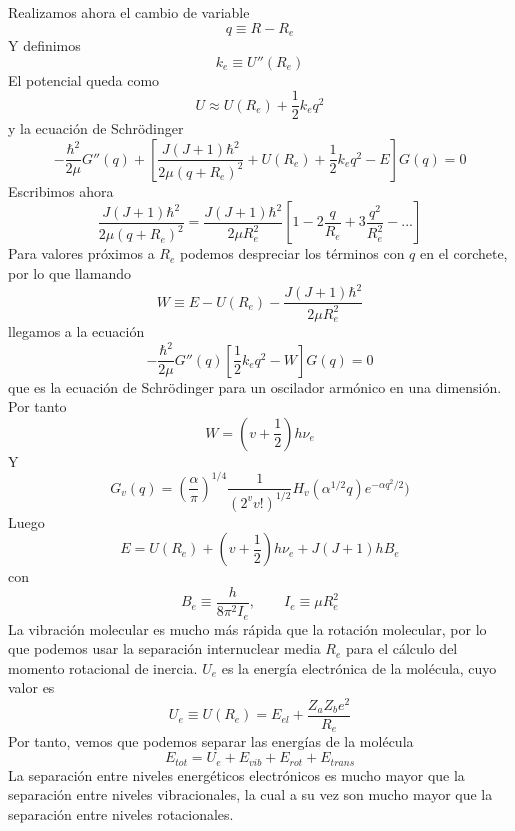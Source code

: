 \documentclass[a4paper]{article}
\begin{document}
Realizamos ahora el cambio de variable 
\begin{equation}
q \equiv R-R_e
\end{equation}
Y definimos 
\begin{equation}
k_e \equiv	U''(R_e)
\end{equation}
El potencial queda como
\begin{equation}
U \approx U(R_e)+\frac{1}{2}k_eq^2
\end{equation}
y la ecuación de Schrödinger
\begin{equation}
-\frac{\hbar^2}{2\mu}G''(q)+\left[\frac{J(J+1)\hbar^2}{2\mu (q+R_e)^2}+U(R_e)+\frac{1}{2}k_eq^2-E\right]G(q)=0
\end{equation}
Escribimos ahora
\begin{equation}\label{aproximacion2}
\frac{J(J+1)\hbar^2}{2\mu (q+R_e)^2}=\frac{J(J+1)\hbar^2}{2\mu R_e^2}\left[1-2\frac{q}{R_e}+3\frac{q^2}{R_e^2}-...\right]
\end{equation}
Para valores próximos a $R_e$ podemos despreciar los términos con $q$ en el corchete, por lo que llamando
\begin{equation}
W \equiv	E-U(R_e)-\frac{J(J+1)\hbar^2}{2\mu R_e^2}
\end{equation}
llegamos a la ecuación
\begin{equation}
-\frac{\hbar^2}{2\mu}G''(q)\left[\frac{1}{2}k_eq^2-W\right] G(q)=0
\end{equation}
que es la ecuación de Schrödinger para un oscilador armónico en una dimensión. Por tanto
\begin{equation}
W=\left(v+\frac{1}{2}\right)h\nu_e
\end{equation}
Y 
\begin{equation}
G_v(q)=\left(\frac{\alpha}{\pi}\right)^{1/4}\frac{1}{(2^vv!)^{1/2}}H_v(\alpha ^{1/2}q)e^{-\alpha q^2/2})
\end{equation}
Luego
\begin{equation}
E=U(R_e)+\left(v+\frac{1}{2}\right)h\nu_e+J(J+1)hB_e
\end{equation}
con
\begin{equation}
B_e \equiv	\frac{h}{8\pi^2I_e}, \qquad I_e\equiv \mu R_e^2
\end{equation}
La vibración molecular es mucho más rápida que la rotación molecular, por lo que podemos usar la separación internuclear media $R_e$ para el cálculo del momento rotacional de inercia.
$U_e$ es la energía electrónica de la molécula, cuyo valor es
\begin{equation}
U_e \equiv	U(R_e)=E_{el} +\frac{Z_aZ_be^2}{R_e}
\end{equation}
Por tanto, vemos que podemos separar las energías de la molécula
\begin{equation}
E_{tot} = U_e+E_{vib}+E_{rot}+E_{trans}
\end{equation}
La separación entre niveles energéticos electrónicos es mucho mayor que la separación entre niveles vibracionales, la cual a su vez son mucho mayor que la separación entre niveles rotacionales.\\
\end{document}
